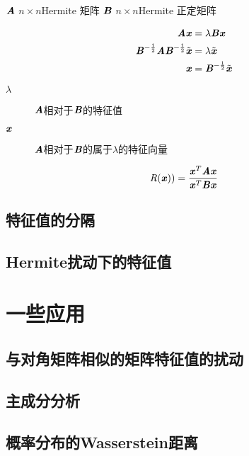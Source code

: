 $\MA$ $n \times n$Hermite 矩阵
$\MB$ $n \times n$Hermite 正定矩阵

\begin{definition}
    $$
    \begin{aligned}
        \MA \Vx & = \lambda \MB \Vx \\
        \MB^{-\frac{1}{2}}\MA \MB^{- \frac{1}{2}}\tilde{\Vx} & = \lambda \tilde{\Vx} \\
        \Vx & = \MB^{-\frac{1}{2}}\tilde{\Vx}
    \end{aligned}
    $$
    \begin{description}
        \item[$\lambda$] $\MA$相对于$\MB$的特征值
        \item[$\Vx$] $\MA$相对于$\MB$的属于$\lambda$的特征向量
    \end{description}
\end{definition}

\begin{definition}
    $$
    \SR(\Vx)) = \frac{\Vx^T \MA \Vx}{\Vx^T \MB \Vx}
    $$
\end{definition}

\subsection{特征值的分隔}
\label{sub:特征值的分隔}

\subsection{Hermite扰动下的特征值}
\label{sub:Hermite扰动下的特征值}

\section{一些应用}
\label{sec:一些应用}

\subsection{与对角矩阵相似的矩阵特征值的扰动}
\label{sub:与对角矩阵相似的矩阵特征值的扰动}

\subsection{主成分分析}
\label{sub:主成分分析}

\subsection{概率分布的Wasserstein距离}
\label{sub:概率分布的Wasserstein距离}


